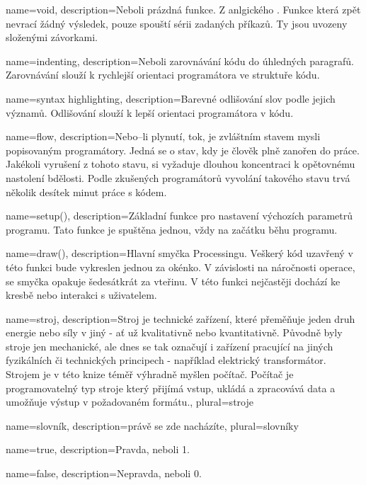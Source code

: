 {
  name={void},
  description={Neboli prázdná funkce. Z anlgického . Funkce která zpět nevrací žádný výsledek, pouze spouští sérii zadaných příkazů. Ty jsou uvozeny složenými závorkami.}
}

{
  name={indenting},
  description={Neboli zarovnávání kódu do úhledných paragrafů. Zarovnávání slouží k rychlejší orientaci programátora ve struktuře kódu.}
}


{
  name={syntax highlighting},
  description={Barevné odlišování slov podle jejich významů. Odlišování slouží k lepší orientaci programátora v kódu.}
}

{
  name={flow},
  description={Nebo--li plynutí, tok, je zvláštním stavem mysli popisovaným programátory. Jedná se o stav, kdy je člověk plně zanořen do práce. Jakékoli vyrušení z tohoto stavu, si vyžaduje dlouhou koncentraci k opětovnému nastolení bdělosti. Podle zkušených programátorů vyvolání takového stavu trvá několik desítek minut práce s kódem.}
}

{
  name={setup()},
  description={Základní funkce pro nastavení výchozích parametrů programu. Tato funkce je spuštěna jednou, vždy na začátku běhu programu.}
}

{
  name={draw()},
  description={Hlavní smyčka Processingu. Veškerý kód uzavřený v této funkci bude vykreslen jednou za okénko. V závislosti na náročnosti operace, se smyčka opakuje šedesátkrát za vteřinu. V této funkci nejčastěji dochází ke kresbě nebo interakci s uživatelem.}
}

{
  name={stroj},
  description={Stroj je technické zařízení, které přeměňuje jeden druh energie nebo síly v jiný - ať už kvalitativně nebo kvantitativně. Původně byly stroje jen mechanické, ale dnes se tak označují i zařízení pracující na jiných fyzikálních či technických principech - například elektrický transformátor. Strojem je v této knize téměř výhradně myšlen počítač. Počítač je programovatelný typ stroje který přijímá vstup, ukládá a zpracovává data a umožňuje výstup v požadovaném formátu.},
  plural={stroje}
}

{
  name={slovník},
  description={právě se zde nacházíte},
  plural={slovníky}
}


{
  name={true},
  description={Pravda, neboli 1.}
}

{
  name={false},
  description={Nepravda, neboli 0.}
}


